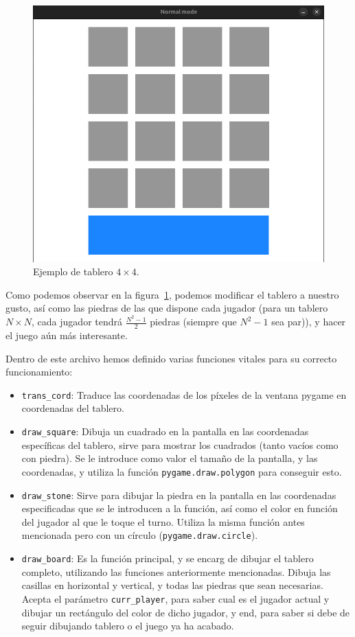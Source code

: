 \documentclass[a4paper,12pt]{article}
\begin{document}
\begin{figure}[h]
    \centering
    \includegraphics[scale=0.2]{./imagenes/tablero4x4.png}
    \caption{Ejemplo de tablero $4 \times 4$.}\label{fig:tablero4x4}
\end{figure}
Como podemos observar en la figura~\ref{fig:tablero4x4}, podemos modificar el tablero a nuestro gusto, así como las piedras de las que dispone cada jugador (para un tablero
$N \times N$, cada jugador tendrá $\frac{N^2 - 1}{2}$ piedras (siempre que $N^2 -1$ sea par)), y hacer el juego aún más interesante.

\vspace{\baselineskip}
Dentro de este archivo hemos definido varias funciones vitales para su correcto funcionamiento:
\begin{itemize}
    \item \texttt{trans\_cord}: Traduce las coordenadas de los píxeles de la ventana pygame en coordenadas del tablero.
    \item \texttt{draw\_square}: Dibuja un cuadrado en la pantalla en las coordenadas específicas del tablero, sirve para mostrar los cuadrados (tanto vacíos
    como con piedra). Se le introduce como valor el tamaño de la pantalla, y las coordenadas, y utiliza la función \texttt{pygame.draw.polygon} para conseguir esto.
    \item \texttt{draw\_stone}: Sirve para dibujar la piedra en la pantalla en las coordenadas especificadas que se le introducen a la función, así como el color en 
    función del jugador al que le toque el turno. Utiliza la misma función antes mencionada pero con un círculo (\texttt{pygame.draw.circle}).
    \item \texttt{draw\_board}: Es la función principal, y se encarg de dibujar el tablero completo, utilizando las funciones anteriormente mencionadas. Dibuja las casillas
    en horizontal y vertical, y todas las piedras que sean necesarias. Acepta el parámetro \texttt{curr\_player}, para saber cual es el jugador actual y dibujar un rectángulo 
    del color de dicho jugador, y end, para saber si debe de seguir dibujando tablero o el juego ya ha acabado.
\end{itemize}
\end{document}
